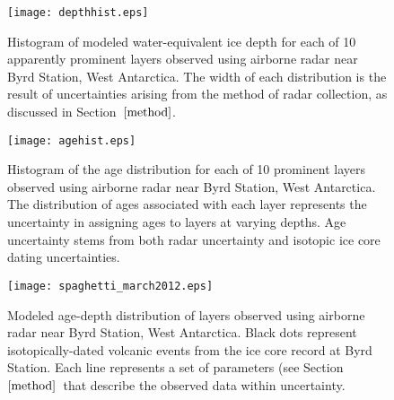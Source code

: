 \documentclass[jgrga]{agutex}
\begin{document}
\begin{article}







\end{article}


\begin{figure}
	\texttt{[image: depthhist.eps]}
	\label{depthhist}
	\caption{Histogram of modeled water-equivalent ice depth for each of 10 apparently prominent layers observed using airborne radar near Byrd Station, West Antarctica. The width of each distribution is the result of uncertainties arising from the method of radar collection, as discussed in Section~$\ref{method}$.}
\end{figure}

\begin{figure}
	\texttt{[image: agehist.eps]}
	\label{agehist}
	\caption{Histogram of the age distribution for each of 10 prominent layers observed using airborne radar near Byrd Station, West Antarctica. The distribution of ages associated with each layer represents the uncertainty in assigning ages to layers at varying depths. Age uncertainty stems from both radar uncertainty and isotopic ice core dating uncertainties.}
\end{figure}

\begin{figure}
	\texttt{[image: spaghetti\_march2012.eps]}
	\label{spaghetti}
	\caption{ Modeled age-depth distribution of layers observed using airborne radar near Byrd Station, West Antarctica. Black dots represent isotopically-dated volcanic events from the ice core record at Byrd Station. Each line represents a set of parameters (see Section~$\ref{method}$~that describe the observed data within uncertainty.    }
\end{figure}
\end{document}

